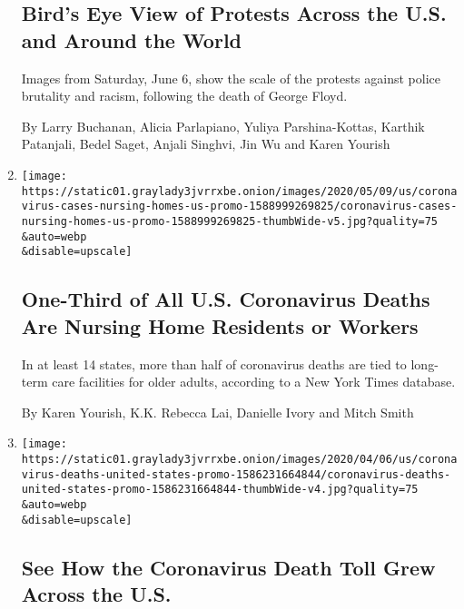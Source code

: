 \begin{enumerate}
{  \subsection{Bird's Eye View of Protests Across the U.S. and Around the
  World}\label{birds-eye-view-of-protests-across-the-us-and-around-the-world}}

  Images from Saturday, June 6, show the scale of the protests against
  police brutality and racism, following the death of George Floyd.

  By Larry Buchanan, Alicia Parlapiano, Yuliya Parshina-Kottas, Karthik
  Patanjali, Bedel Saget, Anjali Singhvi, Jin Wu and Karen Yourish
\item
  \href{/interactive/2020/05/09/us/coronavirus-cases-nursing-homes-us.html}{}

  \texttt{[image: https://static01.graylady3jvrrxbe.onion/images/2020/05/09/us/coronavirus-cases-nursing-homes-us-promo-1588999269825/coronavirus-cases-nursing-homes-us-promo-1588999269825-thumbWide-v5.jpg?quality=75\\\&auto=webp\\\&disable=upscale]}

  \hypertarget{one-third-of-all-us-coronavirus-deaths-are-nursing-home-residents-or-workers}{%
  \subsection{One-Third of All U.S. Coronavirus Deaths Are Nursing Home
  Residents or
  Workers}\label{one-third-of-all-us-coronavirus-deaths-are-nursing-home-residents-or-workers}}

  In at least 14 states, more than half of coronavirus deaths are tied
  to long-term care facilities for older adults, according to a New York
  Times database.

  By Karen Yourish, K.K. Rebecca Lai, Danielle Ivory and Mitch Smith
\item
  \href{/interactive/2020/04/06/us/coronavirus-deaths-united-states.html}{}

  \texttt{[image: https://static01.graylady3jvrrxbe.onion/images/2020/04/06/us/coronavirus-deaths-united-states-promo-1586231664844/coronavirus-deaths-united-states-promo-1586231664844-thumbWide-v4.jpg?quality=75\\\&auto=webp\\\&disable=upscale]}

  \hypertarget{see-how-the-coronavirus-death-toll-grew-across-the-us}{%
  \subsection{See How the Coronavirus Death Toll Grew Across the
  U.S.}\label{see-how-the-coronavirus-death-toll-grew-across-the-us}}


\end{enumerate}
